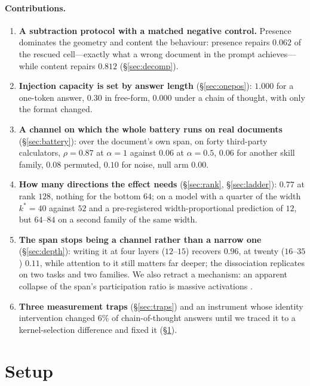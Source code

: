 \documentclass{article}
\begin{document}
\paragraph{Contributions.}
\begin{enumerate}\itemsep0pt\parskip0pt
\item \textbf{A subtraction protocol with a matched negative control.} Presence
dominates the geometry and content the behaviour: presence repairs $0.062$ of
the rescued cell---exactly what a wrong document in the prompt achieves---while
content repairs $0.812$ (\S\ref{sec:decomp}).
\item \textbf{Injection capacity is set by answer length} (\S\ref{sec:onepos}):
$1.000$ for a one-token answer, $0.30$ in free-form, $0.000$ under a chain of
thought, with only the format changed.
\item \textbf{A channel on which the whole battery runs on real documents}
(\S\ref{sec:battery}): over the document's own span, on forty third-party
calculators, $\rho = 0.87$ at $\alpha=1$ against $0.06$ at $\alpha=0.5$, $0.06$
for another skill family, $0.08$ permuted, $0.10$ for noise, null arm $0.00$.
\item \textbf{How many directions the effect needs} (\S\ref{sec:rank},
\S\ref{sec:ladder}): $0.77$ at rank $128$, nothing for the bottom $64$; on a
model with a quarter of the width $k^{*}=40$ against $52$ and a pre-registered
width-proportional prediction of $12$, but $64$--$84$ on a second family of
the same width.
\item \textbf{The span stops being a channel rather than a narrow one}
(\S\ref{sec:depth}): writing it at four layers ($12$--$15$) recovers $0.96$, at
twenty ($16$--$35$) $0.11$, while attention to it still matters far deeper; the
dissociation replicates on two tasks and two families. We also retract a
mechanism: an apparent collapse of the span's participation ratio is massive
activations \citep{sun2024massive}.
\item \textbf{Three measurement traps} (\S\ref{sec:traps}) and an instrument
whose identity intervention changed $6\%$ of chain-of-thought answers until we
traced it to a kernel-selection difference and fixed it (\S\ref{sec:setup}).
\end{enumerate}

\section{Setup}
\label{sec:setup}
\end{document}
